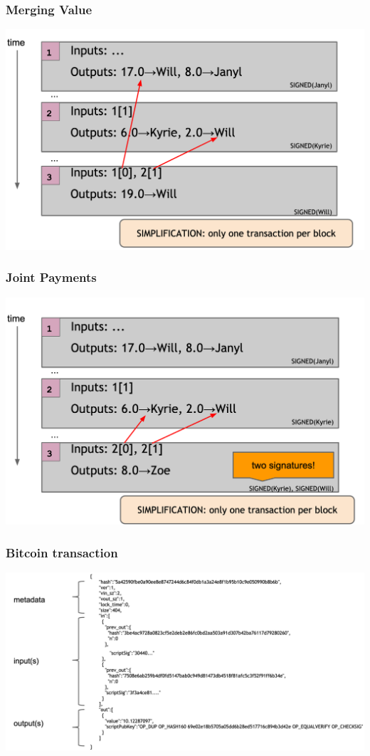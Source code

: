 \documentclass{beamer}
\begin{document}
\begin{frame}
  \frametitle{Merging Value}
  
\centering
	\includegraphics[scale=0.3]{3-1}
\end{frame}
\begin{frame}
  \frametitle{Joint Payments}
  
\centering
	\includegraphics[scale=0.3]{4-1}
\end{frame}
\begin{frame}
  \frametitle{Bitcoin transaction}

\centering
	\includegraphics[scale=0.3]{transaction}
\end{frame}
\end{document}
